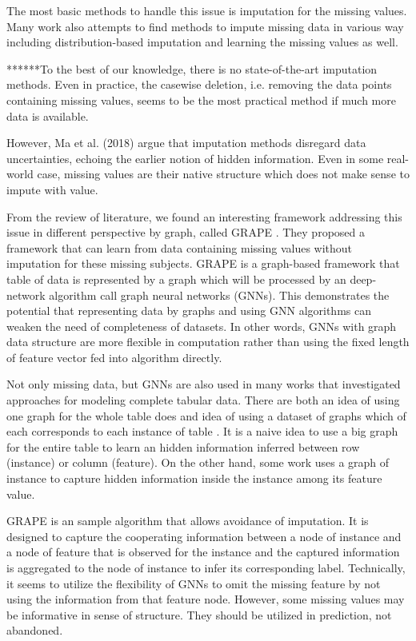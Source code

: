 The most basic methods to handle this issue is imputation for the missing values.
Many work also attempts to find methods to impute missing data in various way including distribution-based imputation and learning the missing values as well.

******To the best of our knowledge, there is no state-of-the-art imputation methods.
Even in practice, the casewise deletion, i.e. removing the data points containing missing values, seems to be the most practical method if much more data is available. 

However, Ma et al. (2018) \cite{Ma} argue that imputation methods disregard data uncertainties, echoing the earlier notion of hidden information.
Even in some real-world case, missing values are their native structure which does not make sense to impute with value.





From the review of literature, we found an interesting framework addressing this issue in different perspective by graph, called GRAPE \cite{GRAPE}.
They proposed a framework that can learn from data containing missing values without imputation for these missing subjects.
GRAPE is a graph-based framework that table of data is represented by a graph which will be processed by an deep-network algorithm call graph neural networks (GNNs).
This demonstrates the potential that representing data by graphs and using GNN algorithms can weaken the need of completeness of datasets.
In other words, GNNs with graph data structure are more flexible in computation rather than using the fixed length of feature vector fed into algorithm directly.

Not only missing data, but GNNs are also used in many works that investigated approaches for modeling complete tabular data. 
There are both an idea of using one graph for the whole table \cite{grape} does and idea of using a dataset of graphs which of each corresponds to each instance of table \cite{...}.
It is a naive idea to use a big graph for the entire table to learn an hidden information inferred between row (instance) or column (feature).
On the other hand, some work uses a graph of instance to capture hidden information inside the instance among its feature value.


GRAPE is an sample algorithm that allows avoidance of imputation.
It is designed to capture the cooperating information between a node of instance and a node of feature that is observed for the instance and the captured information is aggregated to the node of instance to infer its corresponding label.
Technically, it seems to utilize the flexibility of GNNs to omit the missing feature by not using the information from that feature node.
However, some missing values may be informative in sense of structure.
They should be utilized in prediction, not abandoned.


